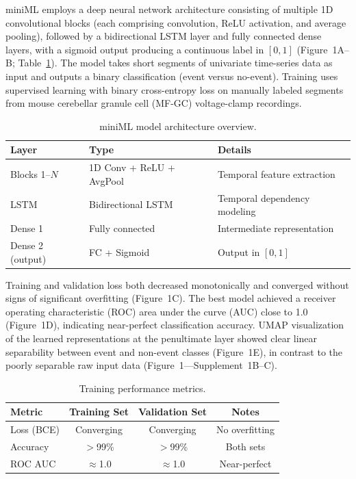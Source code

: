 \documentclass[11pt]{article}
\begin{document}
miniML employs a deep neural network architecture consisting of multiple 1D convolutional blocks (each comprising convolution, ReLU activation, and average pooling), followed by a bidirectional LSTM layer and fully connected dense layers, with a sigmoid output producing a continuous label in $[0, 1]$ (Figure~1A--B; Table~\ref{tab:architecture}). The model takes short segments of univariate time-series data as input and outputs a binary classification (event versus no-event). Training uses supervised learning with binary cross-entropy loss on manually labeled segments from mouse cerebellar granule cell (MF-GC) voltage-clamp recordings.

\begin{table}[H]
\centering
\caption{miniML model architecture overview.}
\label{tab:architecture}
\begin{tabular}{lll}
\toprule
Layer & Type & Details \\
\midrule
Blocks 1--$N$ & 1D Conv + ReLU + AvgPool & Temporal feature extraction \\
LSTM & Bidirectional LSTM & Temporal dependency modeling \\
Dense 1 & Fully connected & Intermediate representation \\
Dense 2 (output) & FC + Sigmoid & Output in $[0, 1]$ \\
\bottomrule
\end{tabular}
\end{table}

Training and validation loss both decreased monotonically and converged without signs of significant overfitting (Figure~1C). The best model achieved a receiver operating characteristic (ROC) area under the curve (AUC) close to 1.0 (Figure~1D), indicating near-perfect classification accuracy. UMAP visualization of the learned representations at the penultimate layer showed clear linear separability between event and non-event classes (Figure~1E), in contrast to the poorly separable raw input data (Figure~1---Supplement~1B--C).

\begin{table}[H]
\centering
\caption{Training performance metrics.}
\label{tab:training}
\begin{tabular}{lccc}
\toprule
Metric & Training Set & Validation Set & Notes \\
\midrule
Loss (BCE) & Converging & Converging & No overfitting \\
Accuracy & $>$99\% & $>$99\% & Both sets \\
ROC AUC & $\approx$1.0 & $\approx$1.0 & Near-perfect \\
\bottomrule
\end{tabular}
\end{table}
\end{document}
